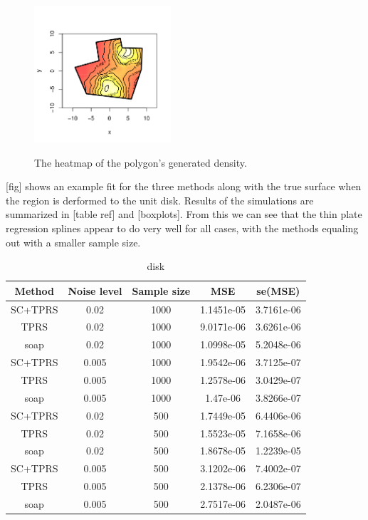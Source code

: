 \documentclass[a4paper,10pt]{amsart}
\begin{document}
\begin{figure}
\centering
\includegraphics[width=2in]{figs-otherdomains/fig9.png} \\
\caption{The heatmap of the polygon's generated density.}
\label{fig9}
\end{figure}


[fig] shows an example fit for the three methods along with the true surface when the region is derformed to the unit disk. Results of the simulations are summarized in [table ref] and [boxplots]. From this we can see that the thin plate regression splines appear to do very well for all cases, with the methods equaling out with a smaller sample size.

\begin{table}[ht]
\begin{tabular}{c c c c c}\\
Method & Noise level & Sample size & MSE & se(MSE)\\
\hline
\hline
SC+TPRS & 0.02 & 1000 & 1.1451e-05 & 3.7161e-06\\
TPRS & 0.02 & 1000 & 9.0171e-06 & 3.6261e-06\\
soap & 0.02 & 1000 & 1.0998e-05 & 5.2048e-06\\
SC+TPRS & 0.005 & 1000 & 1.9542e-06 & 3.7125e-07\\
TPRS & 0.005 & 1000 & 1.2578e-06 & 3.0429e-07\\
soap & 0.005 & 1000 & 1.47e-06 & 3.8266e-07\\
SC+TPRS & 0.02 & 500 & 1.7449e-05 & 6.4406e-06\\
TPRS & 0.02 & 500 & 1.5523e-05 & 7.1658e-06\\
soap & 0.02 & 500 & 1.8678e-05 & 1.2239e-05\\
SC+TPRS & 0.005 & 500 & 3.1202e-06 & 7.4002e-07\\
TPRS & 0.005 & 500 & 2.1378e-06 & 6.2306e-07\\
soap & 0.005 & 500 & 2.7517e-06 & 2.0487e-06\\
\end{tabular}
\caption{disk}
\label{}
\end{table}
\end{document}

